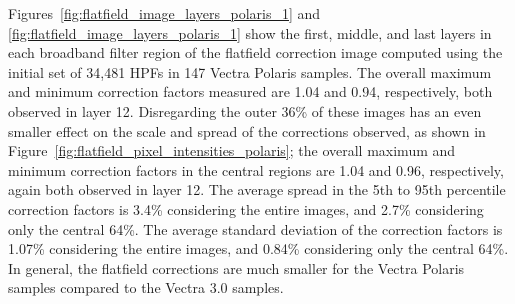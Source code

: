 \documentclass[letterpaper,11pt]{article}
\newcommand{\reffig}[1]{Figure~\ref{#1}}
\begin{document}
Figures~\ref{fig:flatfield_image_layers_polaris_1} and \ref{fig:flatfield_image_layers_polaris_1} show the first, middle, and last layers in each broadband filter region of the flatfield correction image computed using the initial set of 34,481 HPFs in 147 Vectra Polaris samples. The overall maximum and minimum correction factors measured are 1.04 and 0.94, respectively, both observed in layer 12. Disregarding the outer 36\% of these images has an even smaller effect on the scale and spread of the corrections observed, as shown in \reffig{fig:flatfield_pixel_intensities_polaris}; the overall maximum and minimum correction factors in the central regions are 1.04 and 0.96, respectively, again both observed in layer 12. The average spread in the 5th to 95th percentile correction factors is 3.4\% considering the entire images, and 2.7\% considering only the central 64\%. The average standard deviation of the correction factors is 1.07\% considering the entire images, and 0.84\% considering only the central 64\%. In general, the flatfield corrections are much smaller for the Vectra Polaris samples compared to the Vectra 3.0 samples. 
\end{document}
